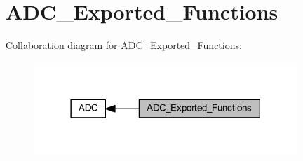 \hypertarget{group___a_d_c___exported___functions}{}\section{A\+D\+C\+\_\+\+Exported\+\_\+\+Functions}
\label{group___a_d_c___exported___functions}
Collaboration diagram for A\+D\+C\+\_\+\+Exported\+\_\+\+Functions\+:
\nopagebreak
\begin{figure}[H]
\begin{center}
\leavevmode
\includegraphics[width=282pt]{group___a_d_c___exported___functions}
\end{center}
\end{figure}
